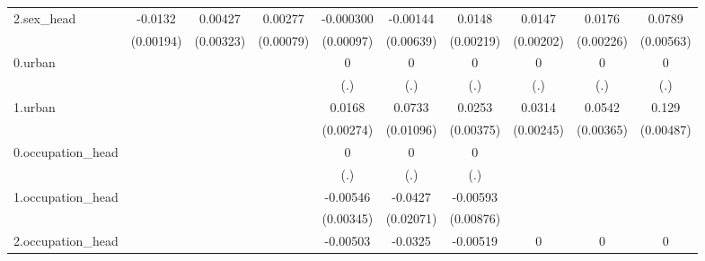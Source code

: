 \begin{table}[htbp]
\begin{tabular}{l*{9}{c}}
2.sex\_head  &     -0.0132\sym{***}&     0.00427         &     0.00277\sym{***}&   -0.000300         &    -0.00144         &      0.0148\sym{***}&      0.0147\sym{***}&      0.0176\sym{***}&      0.0789\sym{***}\\
            &   (0.00194)         &   (0.00323)         &   (0.00079)         &   (0.00097)         &   (0.00639)         &   (0.00219)         &   (0.00202)         &   (0.00226)         &   (0.00563)         \\
0.urban     &                     &                     &                     &           0         &           0         &           0         &           0         &           0         &           0         \\
            &                     &                     &                     &         (.)         &         (.)         &         (.)         &         (.)         &         (.)         &         (.)         \\
1.urban     &                     &                     &                     &      0.0168\sym{***}&      0.0733\sym{***}&      0.0253\sym{***}&      0.0314\sym{***}&      0.0542\sym{***}&       0.129\sym{***}\\
            &                     &                     &                     &   (0.00274)         &   (0.01096)         &   (0.00375)         &   (0.00245)         &   (0.00365)         &   (0.00487)         \\
0.occupation\_head&                     &                     &                     &           0         &           0         &           0         &                     &                     &                     \\
            &                     &                     &                     &         (.)         &         (.)         &         (.)         &                     &                     &                     \\
1.occupation\_head&                     &                     &                     &    -0.00546         &     -0.0427\sym{**} &    -0.00593         &                     &                     &                     \\
            &                     &                     &                     &   (0.00345)         &   (0.02071)         &   (0.00876)         &                     &                     &                     \\
2.occupation\_head&                     &                     &                     &    -0.00503\sym{***}&     -0.0325\sym{***}&    -0.00519         &           0         &           0         &           0         \\

\end{tabular}
\end{table}
